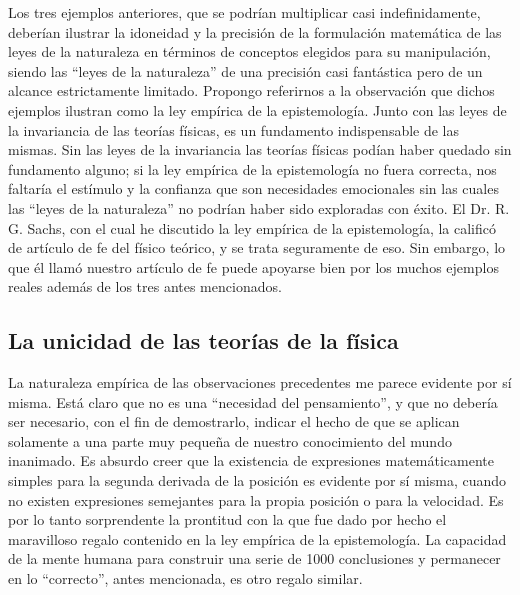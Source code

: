 \documentclass[a4paper, 12pt]{article}
\begin{document}
Los tres ejemplos anteriores, que se podrían multiplicar casi indefinidamente, deberían ilustrar la idoneidad y la precisión de la formulación matemática de las leyes de la naturaleza en términos de conceptos elegidos para su manipulación, siendo las ``leyes de la naturaleza'' de una precisión casi fantástica pero de un alcance estrictamente limitado. Propongo referirnos a la observación que dichos ejemplos ilustran como la ley empírica de la epistemología. Junto con las leyes de la invariancia de las teorías físicas, es un fundamento indispensable de las mismas. Sin las leyes de la invariancia las teorías físicas podían haber quedado sin fundamento alguno; si la ley empírica de la epistemología no fuera correcta, nos faltaría el estímulo y la confianza que son necesidades emocionales sin las cuales las ``leyes de la naturaleza'' no podrían haber sido exploradas con éxito. El  Dr. R. G. Sachs, con el cual he discutido la ley empírica de la epistemología, la calificó de artículo de fe del físico teórico, y se trata seguramente de eso. Sin embargo, lo que él llamó nuestro artículo de fe puede apoyarse bien por los muchos ejemplos reales además de los tres antes mencionados.

\subsection*{La unicidad de las teorías de la física}

La naturaleza empírica de las observaciones precedentes me parece evidente por sí misma. Está claro que no es una ``necesidad del pensamiento'', y que no debería ser necesario, con el fin de demostrarlo, indicar el hecho de que se aplican solamente a una parte muy pequeña de nuestro conocimiento del mundo inanimado. Es absurdo creer que la existencia de expresiones matemáticamente simples para la segunda derivada de la posición es evidente por sí misma, cuando no existen expresiones semejantes para la propia posición o para la velocidad. Es por lo tanto sorprendente la prontitud con la que fue dado por hecho el maravilloso regalo contenido en la ley empírica de la epistemología. La capacidad de la mente humana para construir una serie de 1000 conclusiones y permanecer en lo ``correcto'', antes mencionada, es otro regalo similar.
\end{document}
